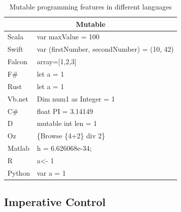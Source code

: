 \documentclass{sig-alternate}
\begin{document}
	\begin{table}[]
		\centering
		\caption{Mutable programming features in different languages}
		\label{my-label}
		\begin{tabular}{|l|l|}
			\hline
			\multicolumn{2}{|c|}{Mutable}                     \\ \hline
			Scala  & var maxValue = 100                         \\ \hline
			Swift  & var (firstNumber, secondNumber) = (10, 42) \\ \hline
			Falcon & array={[}1,2,3{]}                          \\ \hline
			F\#    & let a = 1                                  \\ \hline
			Rust   & let a = 1                                  \\ \hline
			Vb.net & Dim num1  as Integer = 1                   \\ \hline
			C\#    & float PI = 3.14149                         \\ \hline
			D      & mutable int len = 1                        \\ \hline
			Oz     & \{Browse \{4+2\} div 2\}                   \\ \hline
			Matlab & h = 6.626068e-34;                          \\ \hline
			R      & a\textless{}- 1                            \\ \hline
			Python & var a = 1                                  \\ \hline
		\end{tabular}
	\end{table}
	
	\subsection{Imperative Control}
	
\end{document}
